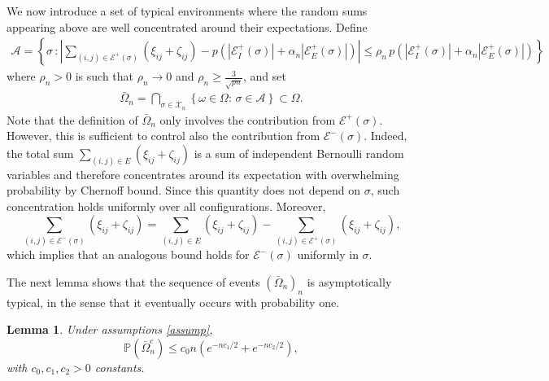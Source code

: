 \documentclass[11pt,oneside]{amsart}
\numberwithin{equation}{section}  %
\theoremstyle{plain}
\newtheorem{lemma}[theorem]{Lemma}
\theoremstyle{remark}
\def \cE {\mathcal{E}}
\def \s {{\sigma}}
\begin{document}
We now introduce a set of typical environments where the random sums appearing above are well concentrated around their expectations. Define
\begin{align}\label{set_concentration}
    \mathcal{A}=\left\{\sigma \,: \left | \sum_{(i, j)\in \cE^{+}(\sigma)}\!\!\!\left(\xi_{ij}+\zeta_{ij}\right) -p\left(\left|\cE_{I}^{+}(\s)\right|+ \alpha_n \left| \cE_{E}^{+}(\s)\right|\right) \right |  \leq \rho_n \,p\left(\left|\cE_{I}^{+}(\s)\right|+\alpha_n\left|\cE_{E}^{+}(\s)\right|\right)\right\}
\end{align}
where $\rho_n>0$ is such that $\rho_n \to 0$ and $\rho_n \geq \frac{3}{\sqrt{pn}}$, and set
\begin{align}\label{Omega-good}
\bar{\Omega}_n=\bigcap_{\sigma \in \mathcal{X}_n} \left\{\omega \in \Omega:\, \sigma \in \mathcal{A}\right\} \subset \Omega.
\end{align}
Note that the definition of $\bar{\Omega}_n$ only involves the contribution from $\cE^{+}(\sigma)$. However, this is sufficient to control also the contribution from $\cE^{-}(\sigma)$. Indeed, the total sum $\sum_{(i,j)\in E} (\xi_{ij}+\zeta_{ij})$ is a sum of independent Bernoulli random variables and therefore concentrates around its expectation with overwhelming probability by Chernoff bound. Since this quantity does not depend on $\sigma$, such concentration holds uniformly over all configurations. Moreover,
\begin{equation}\label{eq:split}
\sum_{(i,j)\in \cE^{-}(\sigma)} (\xi_{ij}+\zeta_{ij})
= \sum_{(i,j)\in E} (\xi_{ij}+\zeta_{ij})
- \sum_{(i,j)\in \cE^{+}(\sigma)} (\xi_{ij}+\zeta_{ij}),
\end{equation}
which implies that an analogous bound holds for $\cE^{-}(\sigma)$ uniformly in $\sigma$. 

The next lemma shows that the sequence of events $(\bar{\Omega}_n)_n$ is asymptotically typical, in the sense that it eventually occurs with probability one.

\begin{lemma}\label{lemma1}
Under assumptions \eqref{assump},
$$
\mathbb{P}\left(\bar{\Omega}^{c}_n\right) \leq c_{0} n \left(e^{-n c_{1}/2}+e^{-n c_{2}/2}\right),
$$
with $c_{0}, c_{1}, c_{2}>0$ constants.
\end{lemma}
\end{document}
